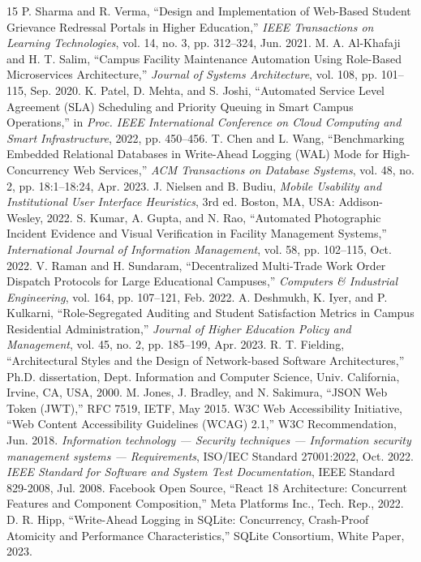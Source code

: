 \documentclass[10pt]{report}
\begin{document}
\begin{thebibliography}{15}
 P. Sharma and R. Verma, ``Design and Implementation of Web-Based Student Grievance Redressal Portals in Higher Education,'' \textit{IEEE Transactions on Learning Technologies}, vol. 14, no. 3, pp. 312--324, Jun. 2021.
 M. A. Al-Khafaji and H. T. Salim, ``Campus Facility Maintenance Automation Using Role-Based Microservices Architecture,'' \textit{Journal of Systems Architecture}, vol. 108, pp. 101--115, Sep. 2020.
 K. Patel, D. Mehta, and S. Joshi, ``Automated Service Level Agreement (SLA) Scheduling and Priority Queuing in Smart Campus Operations,'' in \textit{Proc. IEEE International Conference on Cloud Computing and Smart Infrastructure}, 2022, pp. 450--456.
 T. Chen and L. Wang, ``Benchmarking Embedded Relational Databases in Write-Ahead Logging (WAL) Mode for High-Concurrency Web Services,'' \textit{ACM Transactions on Database Systems}, vol. 48, no. 2, pp. 18:1--18:24, Apr. 2023.
 J. Nielsen and B. Budiu, \textit{Mobile Usability and Institutional User Interface Heuristics}, 3rd ed. Boston, MA, USA: Addison-Wesley, 2022.
 S. Kumar, A. Gupta, and N. Rao, ``Automated Photographic Incident Evidence and Visual Verification in Facility Management Systems,'' \textit{International Journal of Information Management}, vol. 58, pp. 102--115, Oct. 2022.
 V. Raman and H. Sundaram, ``Decentralized Multi-Trade Work Order Dispatch Protocols for Large Educational Campuses,'' \textit{Computers \& Industrial Engineering}, vol. 164, pp. 107--121, Feb. 2022.
 A. Deshmukh, K. Iyer, and P. Kulkarni, ``Role-Segregated Auditing and Student Satisfaction Metrics in Campus Residential Administration,'' \textit{Journal of Higher Education Policy and Management}, vol. 45, no. 2, pp. 185--199, Apr. 2023.
 R. T. Fielding, ``Architectural Styles and the Design of Network-based Software Architectures,'' Ph.D. dissertation, Dept. Information and Computer Science, Univ. California, Irvine, CA, USA, 2000.
 M. Jones, J. Bradley, and N. Sakimura, ``JSON Web Token (JWT),'' RFC 7519, IETF, May 2015.
 W3C Web Accessibility Initiative, ``Web Content Accessibility Guidelines (WCAG) 2.1,'' W3C Recommendation, Jun. 2018.
 \textit{Information technology --- Security techniques --- Information security management systems --- Requirements}, ISO/IEC Standard 27001:2022, Oct. 2022.
 \textit{IEEE Standard for Software and System Test Documentation}, IEEE Standard 829-2008, Jul. 2008.
 Facebook Open Source, ``React 18 Architecture: Concurrent Features and Component Composition,'' Meta Platforms Inc., Tech. Rep., 2022.
 D. R. Hipp, ``Write-Ahead Logging in SQLite: Concurrency, Crash-Proof Atomicity and Performance Characteristics,'' SQLite Consortium, White Paper, 2023.
\end{thebibliography}
\end{document}
